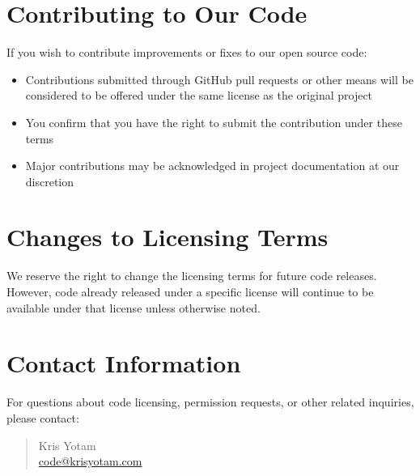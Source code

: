 \documentclass[11pt]{article}
\begin{document}
\section{Contributing to Our Code}
If you wish to contribute improvements or fixes to our open source code:
\begin{itemize}
  \item Contributions submitted through GitHub pull requests or other means will be considered to be offered under the same license as the original project
  \item You confirm that you have the right to submit the contribution under these terms
  \item Major contributions may be acknowledged in project documentation at our discretion
\end{itemize}

\section{Changes to Licensing Terms}
We reserve the right to change the licensing terms for future code releases. However, code already released under a specific license will continue to be available under that license unless otherwise noted.

\section{Contact Information}
For questions about code licensing, permission requests, or other related inquiries, please contact:
\begin{quote}
  Kris Yotam\\
  \href{mailto:code@krisyotam.com}{code@krisyotam.com}
\end{quote}
\end{document}
